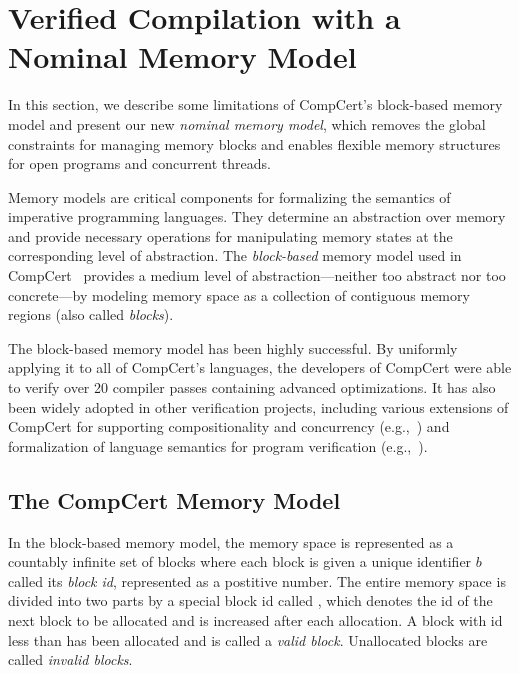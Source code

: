 \section{Verified Compilation with a Nominal Memory Model}
\label{sec:nominal}

In this section, we describe some limitations of CompCert's block-based
memory model and present our new 
{\em nominal memory model}, which removes the global constraints for
managing memory blocks and enables flexible memory structures for open
programs and concurrent threads.

Memory models are critical components for formalizing the semantics of
imperative programming languages. They determine an abstraction over
memory and provide necessary operations for manipulating memory states
at the corresponding level of abstraction.
The \emph{block-based} memory model
used in CompCert~\cite{leroy08,compcert-mem-v2}
provides a medium level of
abstraction---neither too abstract nor too concrete---by modeling
memory space as a collection of contiguous memory regions (also called
\emph{blocks}).

The block-based memory model has been highly successful. By uniformly
applying it to all of CompCert's languages, the developers of CompCert
were able to verify over 20 compiler passes containing advanced
optimizations.  It has also been widely adopted in other verification
projects, including various extensions of CompCert for supporting
compositionality and concurrency
(e.g.,~\cite{sevcik13,compcompcert,compcertm,cascompcert,wang2019,compcertelf20,sepcompcert,compcerts})
and formalization of language semantics for program verification
(e.g.,~\cite{appel11:vst,dscal15,ccal18}).

\subsection{The CompCert Memory Model}
\label{ssec:nominal-bbmm}

In the block-based memory model, the memory space is represented as a
countably infinite set of blocks where each block is given a unique
identifier $b$ called its \emph{block id}, represented
as a postitive number. The entire memory space is
divided into two parts by a special block id called
\nextblock, which
denotes the id of the next block to be allocated
and is increased after each allocation.
A block with id less than \nextblock has been
allocated and is called a \emph{valid block}.
Unallocated blocks are called \emph{invalid blocks}.

